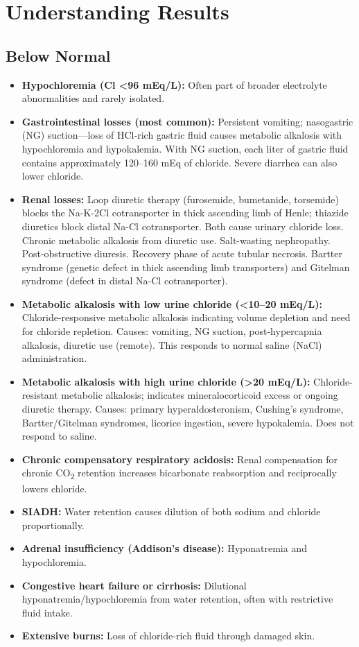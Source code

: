 \section*{Understanding Results}

\subsection*{Below Normal}
\begin{itemize}
  \item \textbf{Hypochloremia (Cl <96 mEq/L):} Often part of broader electrolyte abnormalities and rarely isolated.
  \item \textbf{Gastrointestinal losses (most common):} Persistent vomiting; nasogastric (NG) suction---loss of HCl-rich gastric fluid causes metabolic alkalosis with hypochloremia and hypokalemia. With NG suction, each liter of gastric fluid contains approximately 120--160 mEq of chloride. Severe diarrhea can also lower chloride.
  \item \textbf{Renal losses:} Loop diuretic therapy (furosemide, bumetanide, torsemide) blocks the Na-K-2Cl cotransporter in thick ascending limb of Henle; thiazide diuretics block distal Na-Cl cotransporter. Both cause urinary chloride loss. Chronic metabolic alkalosis from diuretic use. Salt-wasting nephropathy. Post-obstructive diuresis. Recovery phase of acute tubular necrosis. Bartter syndrome (genetic defect in thick ascending limb transporters) and Gitelman syndrome (defect in distal Na-Cl cotransporter).
  \item \textbf{Metabolic alkalosis with low urine chloride (<10--20 mEq/L):} Chloride-responsive metabolic alkalosis indicating volume depletion and need for chloride repletion. Causes: vomiting, NG suction, post-hypercapnia alkalosis, diuretic use (remote). This responds to normal saline (NaCl) administration.
  \item \textbf{Metabolic alkalosis with high urine chloride (>20 mEq/L):} Chloride-resistant metabolic alkalosis; indicates mineralocorticoid excess or ongoing diuretic therapy. Causes: primary hyperaldosteronism, Cushing's syndrome, Bartter/Gitelman syndromes, licorice ingestion, severe hypokalemia. Does not respond to saline.
  \item \textbf{Chronic compensatory respiratory acidosis:} Renal compensation for chronic CO\textsubscript{2} retention increases bicarbonate reabsorption and reciprocally lowers chloride.
  \item \textbf{SIADH:} Water retention causes dilution of both sodium and chloride proportionally.
  \item \textbf{Adrenal insufficiency (Addison's disease):} Hyponatremia and hypochloremia.
  \item \textbf{Congestive heart failure or cirrhosis:} Dilutional hyponatremia/hypochloremia from water retention, often with restrictive fluid intake.
  \item \textbf{Extensive burns:} Loss of chloride-rich fluid through damaged skin.
\end{itemize}

